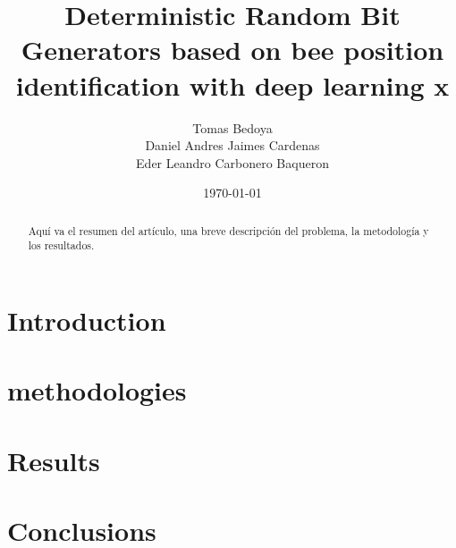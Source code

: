 \documentclass[conference]{IEEEtran}
\title{Deterministic Random Bit Generators based on bee position identification with deep learning x}
\author{Tomas Bedoya \\
Daniel Andres Jaimes Cardenas  \\
Eder Leandro Carbonero Baqueron \\}
\date{\today}
\begin{document}
\maketitle
\begin{abstract}
Aquí va el resumen del artículo, una breve descripción del problema, la metodología y los resultados.
\end{abstract}

\section{Introduction}


\section{methodologies}


\section{Results}


\section{Conclusions}




\end{document}
